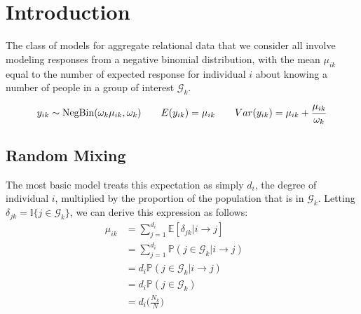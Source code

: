 \documentclass[12pt]{article}
\begin{document}

\def\ci{\perp\!\!\!\perp}
\def\ex{\mathbb{E}}
\def\prob{\mathbb{P}}
\def\ind{\mathbb{I}}
\def\grad{\triangledown}
\def\bigo{\mathcal{O}}
\def\normal{\mathcal{N}}
\def\lognormal{\log\normal}

\section{Introduction}
The class of models for aggregate relational data that we consider all involve modeling responses from a negative binomial distribution, with the mean $\mu_{ik}$ equal to the number of expected response for individual $i$ about knowing a number of people in a group of interest $\mathcal{G}_k$.

$$ y_{ik} \sim \text{NegBin}(\omega_k \mu_{ik}, \omega_k)
\hspace{20 pt} E(y_{ik}) = \mu_{ik} 
\hspace{20 pt} Var(y_{ik}) = \mu_{ik} + \frac{\mu_{ik}}{\omega_k}$$

\subsection{Random Mixing}
\noindent The most basic model treats this expectation as simply $d_i$, the degree of individual $i$, multiplied by the proportion of the population that is in $\mathcal{G}_k$. Letting $\delta_{jk} = \ind\{ j \in \mathcal{G}_k\}$, we can derive this expression as follows:
\begin{align}
\mu_{ik} 
&= \sum_{j=1}^{d_i} \ex[ \delta_{jk} | i \to j ] && \\\nonumber
&= \sum_{j=1}^{d_i} \prob( j \in \mathcal{G}_k | i \to j ) && \\\nonumber
&= d_i \prob( j \in \mathcal{G}_k | i \to j ) && \\\nonumber
&= d_i \prob( j \in \mathcal{G}_k) && \\\nonumber
&= d_i \biggl( \frac{N_k}{N} \biggr)
\end{align}

\end{document}
